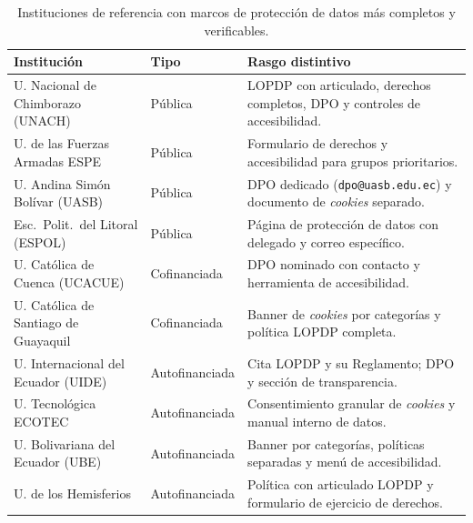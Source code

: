 \documentclass[11pt,a4paper]{article}
\begin{document}
\begin{table}[htbp]
	\centering
	\caption{Instituciones de referencia con marcos de protecci\'on de datos m\'as completos y verificables.}
	\label{tab:buenas}
	\small
	\begin{tabular}{@{}p{5.3cm}p{2.1cm}p{6.4cm}@{}}
		\toprule
		\textbf{Instituci\'on} & \textbf{Tipo} & \textbf{Rasgo distintivo} \\
		\midrule
		U. Nacional de Chimborazo (UNACH) & P\'ublica & LOPDP con articulado, derechos completos, DPO y controles de accesibilidad. \\
		U. de las Fuerzas Armadas ESPE & P\'ublica & Formulario de derechos y accesibilidad para grupos prioritarios. \\
		U. Andina Sim\'on Bol\'ivar (UASB) & P\'ublica & DPO dedicado (\texttt{dpo@uasb.edu.ec}) y documento de \emph{cookies} separado. \\
		Esc.\ Polit.\ del Litoral (ESPOL) & P\'ublica & P\'agina de protecci\'on de datos con delegado y correo espec\'ifico. \\
		U. Cat\'olica de Cuenca (UCACUE) & Cofinanciada & DPO nominado con contacto y herramienta de accesibilidad. \\
		U. Cat\'olica de Santiago de Guayaquil & Cofinanciada & Banner de \emph{cookies} por categor\'ias y pol\'itica LOPDP completa. \\
		U. Internacional del Ecuador (UIDE) & Autofinanciada & Cita LOPDP y su Reglamento; DPO y secci\'on de transparencia. \\
		U. Tecnol\'ogica ECOTEC & Autofinanciada & Consentimiento granular de \emph{cookies} y manual interno de datos. \\
		U. Bolivariana del Ecuador (UBE) & Autofinanciada & Banner por categor\'ias, pol\'iticas separadas y men\'u de accesibilidad. \\
		U. de los Hemisferios & Autofinanciada & Pol\'itica con articulado LOPDP y formulario de ejercicio de derechos. \\
		\bottomrule
	\end{tabular}
\end{table}
\end{document}
